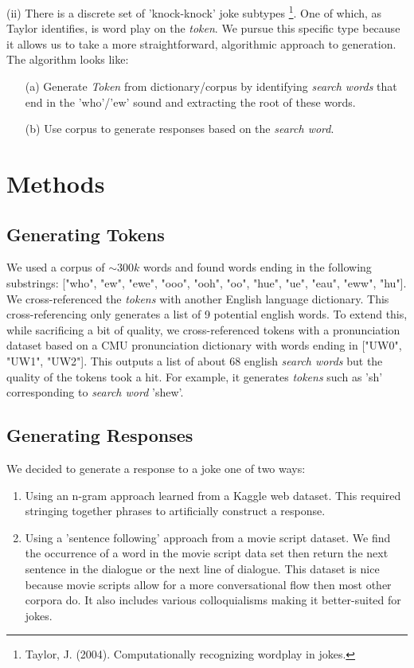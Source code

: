\documentclass[twoside,twocolumn]{article}
\begin{document}
\noindent (ii) There is a discrete set of 'knock-knock' joke subtypes \footnote{Taylor, J. (2004). Computationally recognizing wordplay in jokes.}.
One of which, as Taylor identifies, is word play on the \emph{token}. We pursue this specific type because it allows us to take a more straightforward, algorithmic approach to generation.
The algorithm looks like:
\begin{center}
    \begin{enumerate}
    \item[(a)] Generate \emph{Token} from dictionary/corpus by identifying \emph{search words} that end in the 'who'/'ew' sound and extracting the root of these words.
    \item[(b)] Use corpus to generate responses based on the \emph{search word}.
    \end{enumerate}
\end{center}



\section{Methods}

\subsection{Generating Tokens}

We used a corpus of $\sim 300k$ words and found words ending in the following substrings: ["who", "ew", "ewe", "ooo", "ooh", "oo", "hue", "ue", "eau", "eww", "hu"].  We cross-referenced the \emph{tokens} with another English language dictionary. This cross-referencing only generates a list of 9 potential english words. To extend this, while sacrificing a bit of quality, we cross-referenced tokens with a pronunciation dataset based on a CMU pronunciation dictionary with words ending in ["UW0", "UW1", "UW2"]. This outputs a list of about 68 english \emph{search words} but the quality of the tokens took a hit. For example, it generates \emph{tokens} such as 'sh' corresponding to \emph{search word} 'shew'. 

\subsection{Generating Responses}
We decided to generate a response to a joke one of two ways:
\begin{enumerate}[label=(\roman*)]
\item Using an n-gram approach learned from a Kaggle web dataset. This required stringing together phrases to artificially construct a response.
\item Using a 'sentence following' approach from a movie script dataset. We find the occurrence of a word in the movie script data set then return the next sentence in the dialogue or the next line of dialogue. This dataset is nice because movie scripts allow for a more conversational flow then most other corpora do. It also includes various colloquialisms making it better-suited for jokes.
\end{enumerate}
\end{document}
